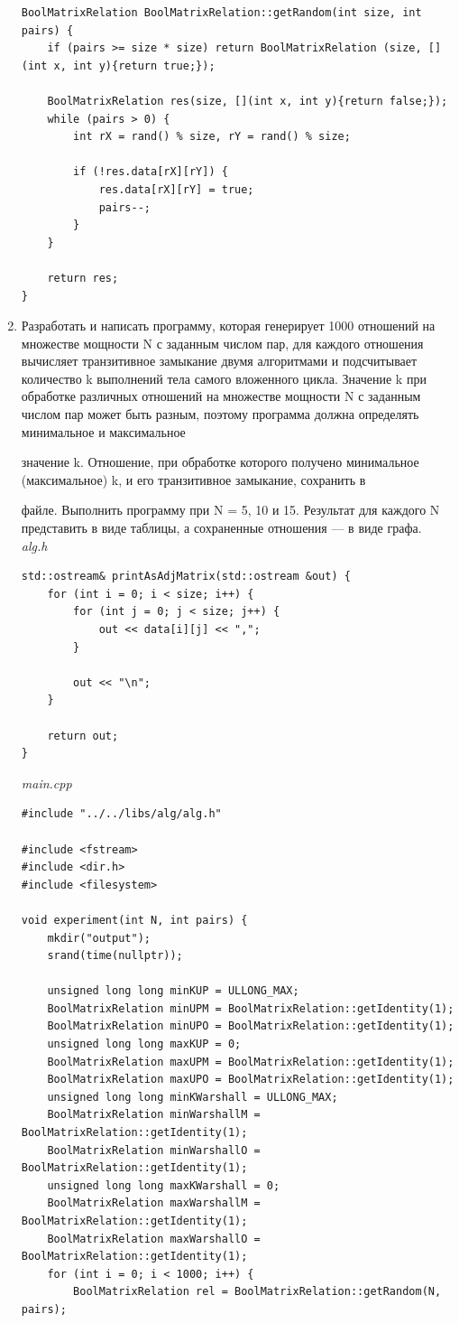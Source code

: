 \documentclass[a4paper,14pt]{extarticle}
\begin{document}
\begin{enumerate}[1.]
\begin{verbatim}
BoolMatrixRelation BoolMatrixRelation::getRandom(int size, int pairs) {
    if (pairs >= size * size) return BoolMatrixRelation (size, [](int x, int y){return true;});
    
    BoolMatrixRelation res(size, [](int x, int y){return false;});
    while (pairs > 0) {
        int rX = rand() % size, rY = rand() % size;

        if (!res.data[rX][rY]) {
            res.data[rX][rY] = true;
            pairs--;
        }
    }

    return res;
}
	\end{verbatim}
	\item Разработать и написать программу, которая генерирует
	      1000 отношений на множестве мощности N с заданным числом пар,
	      для каждого отношения вычисляет транзитивное замыкание двумя
	      алгоритмами и подсчитывает количество k выполнений тела самого
	      вложенного цикла. Значение k при обработке различных отношений на
	      множестве мощности N с заданным числом пар может быть разным,
	      поэтому программа должна определять минимальное и максимальное

	      значение k. Отношение, при обработке которого получено минимальное
	      (максимальное) k, и его транзитивное замыкание, сохранить в

	      файле. Выполнить программу при N = 5, 10 и 15. Результат для каждого
	      N представить в виде таблицы, а сохраненные отношения — в виде графа.\\
	      \textit{alg.h}
	      \begin{verbatim}
std::ostream& printAsAdjMatrix(std::ostream &out) {
    for (int i = 0; i < size; i++) {
        for (int j = 0; j < size; j++) {
            out << data[i][j] << ",";
        }

        out << "\n";
    }

    return out;
}
\end{verbatim}
	      \textit{main.cpp}
	      \begin{verbatim}
#include "../../libs/alg/alg.h"

#include <fstream>
#include <dir.h>
#include <filesystem>

void experiment(int N, int pairs) {
    mkdir("output");
    srand(time(nullptr));
    
    unsigned long long minKUP = ULLONG_MAX;
    BoolMatrixRelation minUPM = BoolMatrixRelation::getIdentity(1);
    BoolMatrixRelation minUPO = BoolMatrixRelation::getIdentity(1);
    unsigned long long maxKUP = 0;
    BoolMatrixRelation maxUPM = BoolMatrixRelation::getIdentity(1);
    BoolMatrixRelation maxUPO = BoolMatrixRelation::getIdentity(1);
    unsigned long long minKWarshall = ULLONG_MAX;
    BoolMatrixRelation minWarshallM = BoolMatrixRelation::getIdentity(1);
    BoolMatrixRelation minWarshallO = BoolMatrixRelation::getIdentity(1);
    unsigned long long maxKWarshall = 0;
    BoolMatrixRelation maxWarshallM = BoolMatrixRelation::getIdentity(1);
    BoolMatrixRelation maxWarshallO = BoolMatrixRelation::getIdentity(1);
    for (int i = 0; i < 1000; i++) {
        BoolMatrixRelation rel = BoolMatrixRelation::getRandom(N, pairs);


\end{verbatim}
\end{enumerate}
\end{document}
